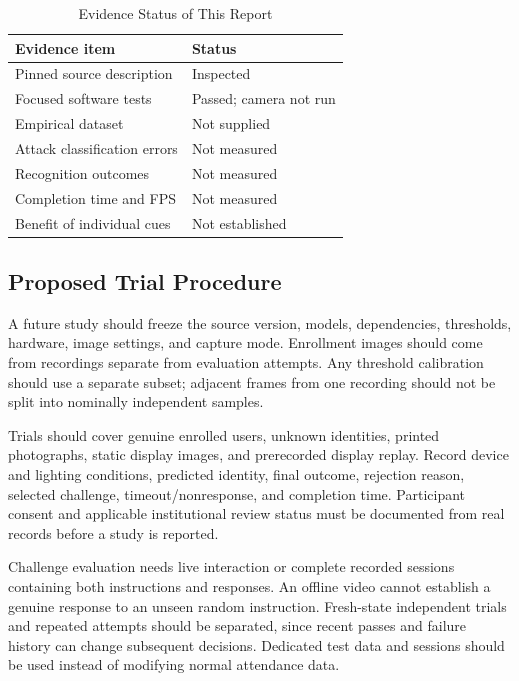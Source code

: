 \documentclass[conference,a4paper]{IEEEtran}
\begin{document}
\begin{table}[t]
\caption{Evidence Status of This Report}
\label{tab:evidence}
\centering
\small
\begin{tabular}{@{}p{}p{}@{}}
\hline
Evidence item & Status \\
\hline
Pinned source description & Inspected \\
Focused software tests & Passed; camera not run \\
Empirical dataset & Not supplied \\
Attack classification errors & Not measured \\
Recognition outcomes & Not measured \\
Completion time and FPS & Not measured \\
Benefit of individual cues & Not established \\
\hline
\end{tabular}
\end{table}

\subsection{Proposed Trial Procedure}
A future study should freeze the source version, models, dependencies, thresholds, hardware, image settings, and capture mode. Enrollment images should come from recordings separate from evaluation attempts. Any threshold calibration should use a separate subset; adjacent frames from one recording should not be split into nominally independent samples.

Trials should cover genuine enrolled users, unknown identities, printed photographs, static display images, and prerecorded display replay. Record device and lighting conditions, predicted identity, final outcome, rejection reason, selected challenge, timeout/nonresponse, and completion time. Participant consent and applicable institutional review status must be documented from real records before a study is reported.

Challenge evaluation needs live interaction or complete recorded sessions containing both instructions and responses. An offline video cannot establish a genuine response to an unseen random instruction. Fresh-state independent trials and repeated attempts should be separated, since recent passes and failure history can change subsequent decisions. Dedicated test data and sessions should be used instead of modifying normal attendance data.
\end{document}
